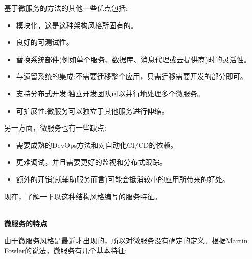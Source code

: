 基于微服务的方法的其他一些优点包括:

\begin{itemize}
\item
模块化，这是这种架构风格所固有的。

\item
良好的可测试性。

\item
替换系统部件(例如单个服务、数据库、消息代理或云提供商)时的灵活性。

\item
与遗留系统的集成:不需要迁移整个应用，只需迁移需要开发的部分即可。

\item
支持分布式开发:独立开发团队可以并行地处理多个微服务。

\item
可扩展性:微服务可以独立于其他服务进行伸缩。
\end{itemize}

另一方面，微服务也有一些缺点:

\begin{itemize}
\item	
需要成熟的DevOps方法和对自动化CI/CD的依赖。

\item
更难调试，并且需要更好的监视和分布式跟踪。

\item
额外的开销(就辅助服务而言)可能会抵消较小的应用所带来的好处。

\end{itemize}

现在，了解一下以这种结构风格编写的服务特征。

\hspace*{\fill} \\ %
\noindent
\textbf{微服务的特点}

由于微服务风格是最近才出现的，所以对微服务没有确定的定义。根据Martin Fowler的说法，微服务有几个基本特征:

